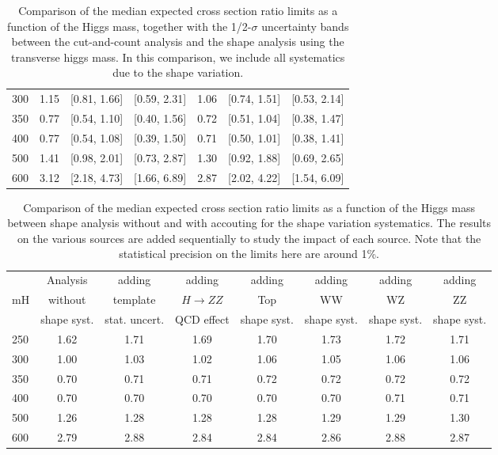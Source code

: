 \begin{table}[!ht]
\begin{center}
{\begin{tabular}{|l|c|c|c|c|c|c|}
300 & 1.15 & [0.81, 1.66] & [0.59, 2.31] & 1.06 & [0.74, 1.51] & [0.53, 2.14] \\
350 & 0.77 & [0.54, 1.10] & [0.40, 1.56] & 0.72 & [0.51, 1.04] & [0.38, 1.47] \\
400 & 0.77 & [0.54, 1.08] & [0.39, 1.50] & 0.71 & [0.50, 1.01] & [0.38, 1.41] \\
500 & 1.41 & [0.98, 2.01] & [0.73, 2.87] & 1.30 & [0.92, 1.88] & [0.69, 2.65] \\ 
600 & 3.12 & [2.18, 4.73] & [1.66, 6.89] & 2.87 & [2.02, 4.22] & [1.54, 6.09] \\
\hline
\end{tabular}
}
\caption{Comparison of the median expected cross section ratio limits as a function 
of the Higgs mass, together with the 1/2-$\sigma$ uncertainty bands between the cut-and-count 
analysis and the shape analysis using the transverse higgs mass. In this comparison, we include all systematics due to 
the shape variation. }
\label{tab:mva_mtshapevscuts_withshapevar_hzz}
\end{center}
\end{table}
\begin{table}[!ht]
\begin{center}
{\normalsize
\begin{tabular}{|l|c|cccccc|}
\hline
      &  Analysis    & adding          &  adding      &  adding      &  adding      & adding      & adding \\
mH  &  without     & template        &  $H\to ZZ$   &  Top         &  WW          & WZ          & ZZ \\
      &  shape syst. & stat. uncert.   &  QCD effect &  shape syst. &  shape syst. & shape syst. & shape syst. \\
\hline
250 & 1.62 & 1.71 & 1.69 & 1.70 & 1.73 & 1.72 & 1.71 \\   
300 & 1.00 & 1.03 & 1.02 & 1.06 & 1.05 & 1.06 & 1.06 \\ 
350 & 0.70 & 0.71 & 0.71 & 0.72 & 0.72 & 0.72 & 0.72 \\
400 & 0.70 & 0.70 & 0.70 & 0.70 & 0.70 & 0.71 & 0.71 \\
500 & 1.26 & 1.28 & 1.28 & 1.28 & 1.29 & 1.29 & 1.30 \\
600 & 2.79 & 2.88 & 2.84 & 2.84 & 2.86 & 2.88 & 2.87 \\
\hline
\end{tabular}
}
\caption{Comparison of the median expected cross section ratio limits as a function 
of the Higgs mass between shape analysis without and with accouting for the 
shape variation systematics. The results on the various sources are added sequentially 
to study the impact of each source. Note that the statistical precision on the limits 
here are around 1\%. }
\label{tab:mva_mtshape_detail}
\end{center}
\end{table}
